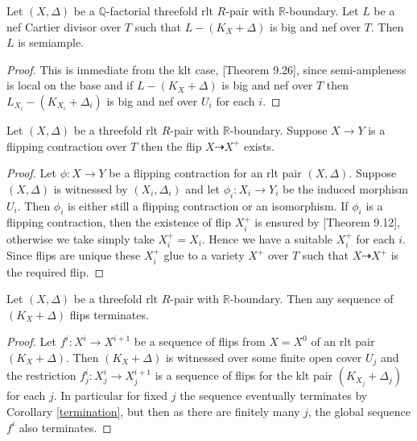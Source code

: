 	\begin{theorem}
		Let $(X,\Delta)$ be a $\mathbb{Q}$-factorial threefold rlt $R$-pair with $\mathbb{R}$-boundary. Let $L$ be a nef Cartier divisor over $T$ such that $L-(K_{X}+\Delta)$ is big and nef over $T$. Then $L$ is semiample.
	\end{theorem}
	
	\begin{proof}
		This is immediate from the klt case, \cite{bhatt2020globally+}[Theorem 9.26], since semi-ampleness is local on the base and if $L-(K_{X}+\Delta)$ is big and nef over $T$ then $L_{X_{i}}-(K_{X_{i}}+\Delta_{i})$ is big and nef over $U_{i}$ for each $i$.
	\end{proof}

	\begin{theorem}
	Let $(X,\Delta)$ be a threefold rlt $R$-pair with $\mathbb{R}$-boundary. Suppose $X \to Y$ is a flipping contraction over $T$ then the flip $X \dashrightarrow X^{+}$ exists. 
	\end{theorem}

	\begin{proof}
	Let $\phi:X \to Y$ be a flipping contraction for an rlt pair $(X,\Delta)$. Suppose $(X,\Delta)$ is witnessed by $(X_{i},\Delta_{i})$ and let $\phi_{i}:X_{i} \to Y_{i}$ be the induced morphism $U_{i}$. Then $\phi_{i}$ is either still a flipping contraction or an isomorphism. If $\phi_{i}$ is a flipping contraction, then the existence of flip $X_{i}^{+}$ is ensured by \cite{bhatt2020globally+}[Theorem 9.12], otherwise we take simply take $X_{i}^{+}=X_{i}$. Hence we have a suitable $X_{i}^{+}$ for each $i$. Since flips are unique these $X_{i}^{+}$ glue to a variety $X^{+}$ over $T$ such that $X \dashrightarrow X^{+}$ is the required flip.
	\end{proof}
	
	\begin{theorem}
		Let $(X,\Delta)$ be a threefold rlt $R$-pair with $\mathbb{R}$-boundary. Then any sequence of $(K_{X}+\Delta)$ flips terminates.
	\end{theorem}
	
	\begin{proof}
		Let $f^{i}:X^{i} \to X^{i+1}$ be a sequence of flips from $X=X^{0}$ of an rlt pair $(K_{X}+\Delta)$. Then $(K_{X}+\Delta)$ is witnessed over some finite open cover $U_{j}$ and the restriction $f^{i}_{j}:X_{j}^{i} \to X_{j}^{i+1}$ is a sequence of flips for the klt pair $(K_{X_{j}}+\Delta_{j})$ for each $j$. In particular for fixed $j$ the sequence eventually terminates by Corollary \ref{termination}, but then as there are finitely many $j$, the global sequence $f^{i}$ also terminates. 
	\end{proof}

